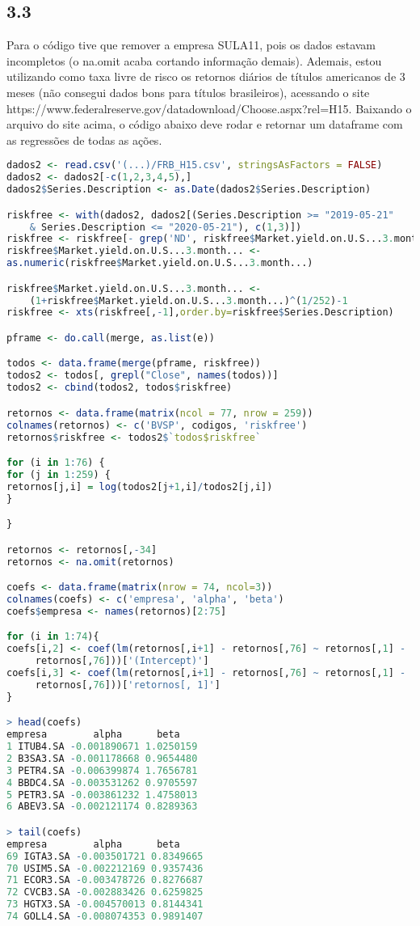 \documentclass[12pt]{article}
\begin{document}
\subsection*{3.3}
Para o código tive que remover a empresa SULA11, pois os dados estavam incompletos (o na.omit acaba cortando informação demais). Ademais, estou utilizando como taxa livre de risco os retornos diários de títulos americanos de 3 meses (não consegui dados bons para títulos brasileiros), acessando o site \\https://www.federalreserve.gov/datadownload/Choose.aspx?rel=H15.
Baixando o arquivo do site acima, o código abaixo deve rodar e retornar um dataframe com as regressões de todas as ações.

\begin{lstlisting}[language=R]
dados2 <- read.csv('(...)/FRB_H15.csv', stringsAsFactors = FALSE)
dados2 <- dados2[-c(1,2,3,4,5),]
dados2$Series.Description <- as.Date(dados2$Series.Description)

riskfree <- with(dados2, dados2[(Series.Description >= "2019-05-21" 
	& Series.Description <= "2020-05-21"), c(1,3)]) 
riskfree <- riskfree[- grep('ND', riskfree$Market.yield.on.U.S...3.month...), ]
riskfree$Market.yield.on.U.S...3.month... <- 
as.numeric(riskfree$Market.yield.on.U.S...3.month...)

riskfree$Market.yield.on.U.S...3.month... <- 
	(1+riskfree$Market.yield.on.U.S...3.month...)^(1/252)-1
riskfree <- xts(riskfree[,-1],order.by=riskfree$Series.Description)

pframe <- do.call(merge, as.list(e))

todos <- data.frame(merge(pframe, riskfree))
todos2 <- todos[, grepl("Close", names(todos))]
todos2 <- cbind(todos2, todos$riskfree)

retornos <- data.frame(matrix(ncol = 77, nrow = 259))
colnames(retornos) <- c('BVSP', codigos, 'riskfree')
retornos$riskfree <- todos2$`todos$riskfree`

for (i in 1:76) {
for (j in 1:259) {
retornos[j,i] = log(todos2[j+1,i]/todos2[j,i])
}

}

retornos <- retornos[,-34]
retornos <- na.omit(retornos)

coefs <- data.frame(matrix(nrow = 74, ncol=3))
colnames(coefs) <- c('empresa', 'alpha', 'beta')
coefs$empresa <- names(retornos)[2:75]

for (i in 1:74){
coefs[i,2] <- coef(lm(retornos[,i+1] - retornos[,76] ~ retornos[,1] -
	 retornos[,76]))['(Intercept)']
coefs[i,3] <- coef(lm(retornos[,i+1] - retornos[,76] ~ retornos[,1] -
	 retornos[,76]))['retornos[, 1]']
}

> head(coefs)
empresa        alpha      beta
1 ITUB4.SA -0.001890671 1.0250159
2 B3SA3.SA -0.001178668 0.9654480
3 PETR4.SA -0.006399874 1.7656781
4 BBDC4.SA -0.003531262 0.9705597
5 PETR3.SA -0.003861232 1.4758013
6 ABEV3.SA -0.002121174 0.8289363

> tail(coefs)
empresa        alpha      beta
69 IGTA3.SA -0.003501721 0.8349665
70 USIM5.SA -0.002212169 0.9357436
71 ECOR3.SA -0.003478726 0.8276687
72 CVCB3.SA -0.002883426 0.6259825
73 HGTX3.SA -0.004570013 0.8144341
74 GOLL4.SA -0.008074353 0.9891407
\end{lstlisting}
\end{document}

